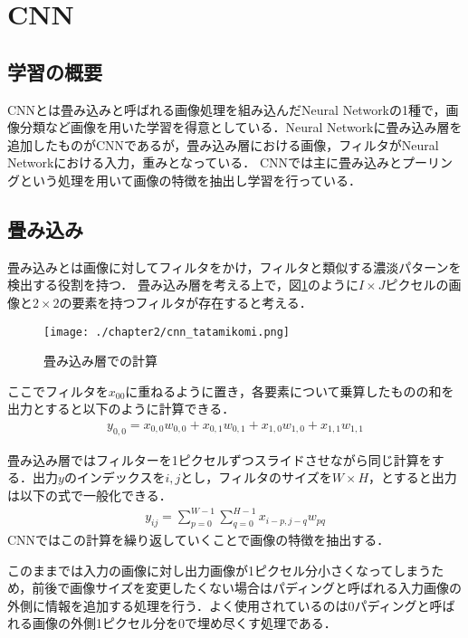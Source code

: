 \section{CNN}
\subsection{学習の概要}
CNNとは畳み込みと呼ばれる画像処理を組み込んだNeural Networkの1種で，画像分類など画像を用いた学習を得意としている．Neural Networkに畳み込み層を追加したものがCNNであるが，畳み込み層における画像，フィルタがNeural Networkにおける入力，重みとなっている．
CNNでは主に畳み込みとプーリングという処理を用いて画像の特徴を抽出し学習を行っている．


\subsection{畳み込み}
畳み込みとは画像に対してフィルタをかけ，フィルタと類似する濃淡パターンを検出する役割を持つ．
畳み込み層を考える上で，図\ref{fig_conv}のように$I \times J$ピクセルの画像と$2 \times 2$の要素を持つフィルタが存在すると考える．
\begin{figure}[]
  \begin{center}
    \texttt{[image: ./chapter2/cnn\_tatamikomi.png]}
    \caption{畳み込み層での計算}
    \label{fig_conv}
  \end{center}
\end{figure}
ここでフィルタを$x_{00}$に重ねるように置き，各要素について乗算したものの和を出力とすると以下のように計算できる．
\begin{align}
  y_{0,0} = x_{0,0}w_{0,0} + x_{0,1}w_{0,1} + x_{1,0}w_{1,0} + x_{1,1}w_{1,1}
  \label{fig_NN1}
\end{align}

畳み込み層ではフィルターを1ピクセルずつスライドさせながら同じ計算をする．出力$y$のインデックスを$i,j$とし，フィルタのサイズを$W\times H$，とすると出力は以下の式で一般化できる．
\begin{align}
  y_{ij} = \sum^{W-1}_{p=0} \sum^{H-1}_{q=0} x_{i-p,j-q}w_{pq}
\end{align}
CNNではこの計算を繰り返していくことで画像の特徴を抽出する．

このままでは入力の画像に対し出力画像が1ピクセル分小さくなってしまうため，前後で画像サイズを変更したくない場合はパディングと呼ばれる入力画像の外側に情報を追加する処理を行う．よく使用されているのは0パディングと呼ばれる画像の外側1ピクセル分を0で埋め尽くす処理である．

